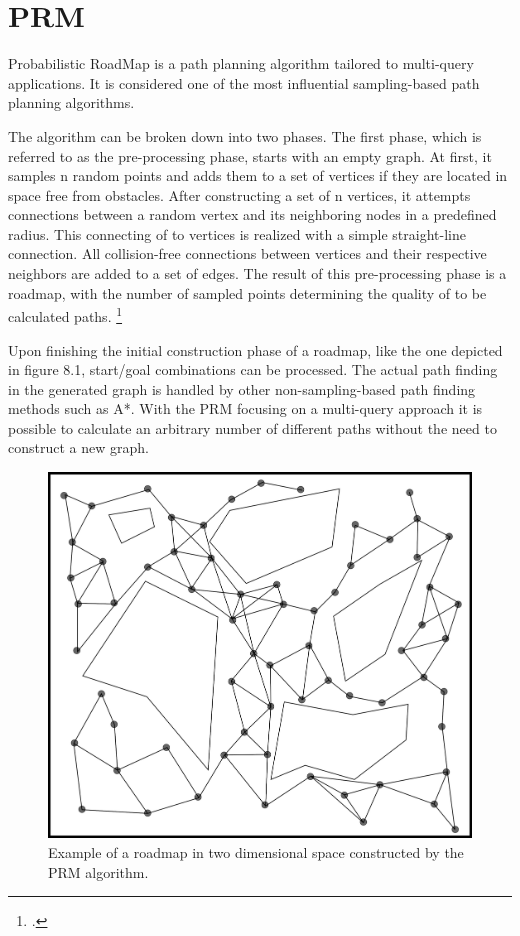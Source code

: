 \section{PRM}

Probabilistic RoadMap is a path planning algorithm tailored to multi-query applications. It is considered one of the most influential sampling-based path planning algorithms. 

The algorithm can be broken down into two phases. The first phase, which is referred to as the pre-processing phase, starts with an empty graph. At first, it samples n random points and adds them to a set of vertices if they are located in space free from obstacles. After constructing a set of n vertices, it attempts connections between a random vertex and its neighboring nodes in a predefined radius. This connecting of to vertices is realized with a simple straight-line connection. All collision-free connections between vertices and their respective neighbors are added to a set of edges. The result of this pre-processing phase is a roadmap, with the number of sampled points determining the quality of to be calculated paths. 
\footcite{Karaman2011}

Upon finishing the initial construction phase of a roadmap, like the one depicted in figure 8.1, start/goal combinations can be processed. 
The actual path finding in the generated graph is handled by other non-sampling-based path finding methods such as A*.\newline
With the PRM focusing on a multi-query approach it is possible to calculate an arbitrary number of different paths without the need to construct a new graph.

\begin{figure}[h]
	\centering
	\includegraphics[width=0.7\linewidth]{img/PRMRoadmap}
	\caption{Example of a roadmap in two dimensional space constructed by the PRM algorithm.}
	\label{fig:path_planning_prm}
\end{figure}


